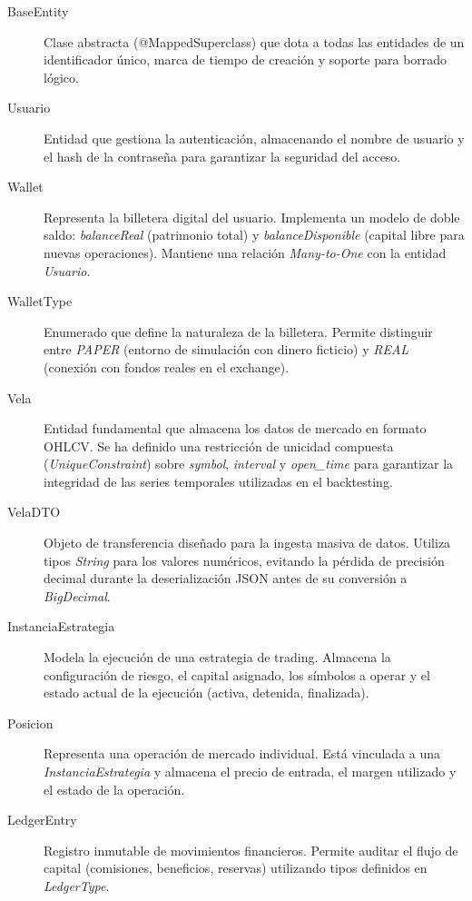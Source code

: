 \documentclass[12pt, letterpaper]{article}
\begin{document}
\begin{description}
    \item[BaseEntity] Clase abstracta (@MappedSuperclass) que dota a todas las entidades de un identificador único, marca de tiempo de creación y soporte para borrado lógico.
    
    \item[Usuario] Entidad que gestiona la autenticación, almacenando el nombre de usuario y el hash de la contraseña para garantizar la seguridad del acceso.
    
    \item[Wallet] Representa la billetera digital del usuario. Implementa un modelo de doble saldo: \textit{balanceReal} (patrimonio total) y \textit{balanceDisponible} (capital libre para nuevas operaciones). Mantiene una relación \textit{Many-to-One} con la entidad \textit{Usuario}.
    
    \item[WalletType] Enumerado que define la naturaleza de la billetera. Permite distinguir entre \textit{PAPER} (entorno de simulación con dinero ficticio) y \textit{REAL} (conexión con fondos reales en el exchange).
    
    \item[Vela] Entidad fundamental que almacena los datos de mercado en formato OHLCV. Se ha definido una restricción de unicidad compuesta (\textit{UniqueConstraint}) sobre \textit{symbol}, \textit{interval} y \textit{open\_time} para garantizar la integridad de las series temporales utilizadas en el backtesting.
    
    \item[VelaDTO] Objeto de transferencia diseñado para la ingesta masiva de datos. Utiliza tipos \textit{String} para los valores numéricos, evitando la pérdida de precisión decimal durante la deserialización JSON antes de su conversión a \textit{BigDecimal}.

    \item[InstanciaEstrategia] Modela la ejecución de una estrategia de trading. Almacena la configuración de riesgo, el capital asignado, los símbolos a operar y el estado actual de la ejecución (activa, detenida, finalizada).
    
    \item[Posicion] Representa una operación de mercado individual. Está vinculada a una \textit{InstanciaEstrategia} y almacena el precio de entrada, el margen utilizado y el estado de la operación.
    
    \item[LedgerEntry] Registro inmutable de movimientos financieros. Permite auditar el flujo de capital (comisiones, beneficios, reservas) utilizando tipos definidos en \textit{LedgerType}.
    

\end{description}
\end{document}
